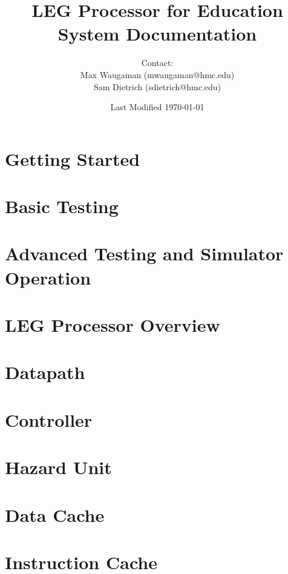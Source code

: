 \documentclass[12pt,letterpaper]{article}
\begin{document}
\title{LEG Processor for Education\\\Large{System Documentation}
}
\author{Contact: \\Max Waugaman (mwaugaman@hmc.edu) \\Sam Dietrich (sdietrich@hmc.edu)}
\date{Last Modified \today}
\maketitle
\thispagestyle{empty}
\pagebreak
\setcounter{page}{1}
\pagebreak

\tableofcontents
\pagebreak

\section{Getting Started}


\section{Basic Testing}

\pagebreak

\section{Advanced Testing and Simulator Operation}

\pagebreak

\section{LEG Processor Overview}


\section{Datapath}


\section{Controller}


\section{Hazard Unit}


%

\section{Data Cache} \label{sec:dcache}

\pagebreak

\section{Instruction Cache} \label{sec:icache}

\pagebreak
\end{document}
